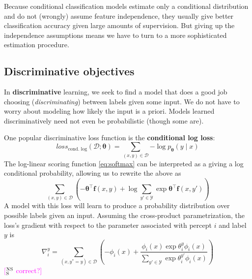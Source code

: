 \documentclass[11pt,letterpaper]{article}
\newcommand{\ensuretext}[1]{#1}
\newcommand{\nssmarker}{\ensuretext{\textcolor{magenta}{\ensuremath{^{\textsc{NS}}_{\textsc{S}}}}}}
\newcommand{\arkcomment}[3]{\ensuretext{\textcolor{#3}{[#1 #2]}}}
\newcommand{\nss}[1]{\arkcomment{\nssmarker}{#1}{magenta}}
\newcommand{\eref}[1]{\eqref{#1}}
\begin{document}
Because conditional classification models estimate only a conditional distribution and 
do not (wrongly) assume feature independence, they usually give better classification accuracy 
given large amounts of supervision. But giving up the independence assumptions 
means we have to turn to a more sophisticated estimation procedure.

\subsection{Discriminative objectives}

In \textbf{discriminative} learning, we seek to find a model that does a good job choosing 
(\textit{discriminating}) between labels given some input. 
We do not have to worry about modeling how likely the input is a priori.
Models learned discriminatively need not even be probabilistic (though some are).

One popular discriminative loss function is the \textbf{conditional log loss}:
\begin{equation}
\textit{loss}_\text{cond. log}(\mathcal{D}; \boldsymbol{\theta}) = \sum_{(x,y)\in\mathcal{D}}{-\log{p_{\boldsymbol{\theta}}(y \mid x)}}
\end{equation}
The log-linear scoring function \eref{eq:softmax} can be interpreted as a giving a log conditional probability, 
allowing us to rewrite the above as 
\begin{equation}
\sum_{(x,y)\in\mathcal{D}}{\left(-\boldsymbol{\theta}^\top\mathbf{f}(x,y)+\log{\sum_{y'\in\mathcal{Y}}{\exp{\boldsymbol{\theta}^\top\mathbf{f}(x,y')}}}\right)}
\end{equation}
A model with this loss will learn to produce a probability distribution over possible labels given an input.
Assuming the cross-product parametrization, 
the loss's gradient with respect to the parameter associated with percept $i$ and label $y$ is
\begin{equation}
\nabla^y_i = \sum_{(x,y^*=y)\in\mathcal{D}}{\left(-\phi_i(x)+\frac{\phi_i(x)\exp{\theta^y_i\phi_i(x)}}{\sum_{y'\in\mathcal{Y}}{\exp{\theta^{y'}_i\phi_i(x)}}}\right)}
\end{equation}
\nss{correct?}
\end{document}

